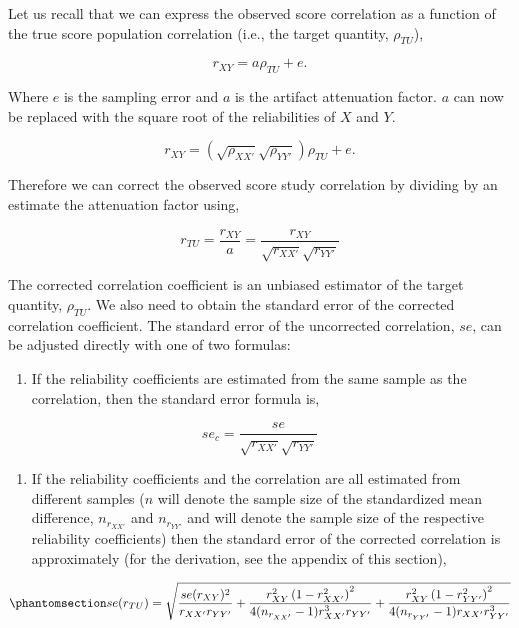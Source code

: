 \documentclass[
  letterpaper,
  DIV=11,
  numbers=noendperiod]{scrreprt}
\providecommand{\tightlist}{%
  \setlength{\itemsep}{0pt}\setlength{\parskip}{0pt}}\usepackage{longtable,booktabs,array}
\begin{document}
Let us recall that we can express the observed score correlation as a
function of the true score population correlation (i.e., the target
quantity, \(\rho_{TU}\)),

\[
r_{XY} = a\rho_{TU} + e.
\]

Where \(e\) is the sampling error and \(a\) is the artifact attenuation
factor. \(a\) can now be replaced with the square root of the
reliabilities of \(X\) and \(Y\).

\[
r_{XY} = \left(\sqrt{\rho_{XX'}}\sqrt{\rho_{YY'}}\right) \rho_{TU} + e.
\]

Therefore we can correct the observed score study correlation by
dividing by an estimate the attenuation factor using,

\[
r_{TU} = \frac{r_{XY}}{\hat{a}} = \frac{r_{XY}}{\sqrt{r_{XX'}}\sqrt{r_{YY'}}}
\]

The corrected correlation coefficient is an unbiased estimator of the
target quantity, \(\rho_{TU}\). We also need to obtain the standard
error of the corrected correlation coefficient. The standard error of
the uncorrected correlation, \(se\), can be adjusted directly with one
of two formulas:

\begin{enumerate}
\def\labelenumi{\arabic{enumi}.}
\tightlist
\item
  If the reliability coefficients are estimated from the same sample as
  the correlation, then the standard error formula is,
\end{enumerate}

\[
se_c =  \frac{se}{\sqrt{r_{XX'}}\sqrt{r_{YY'}}}
\]

\begin{enumerate}
\def\labelenumi{\arabic{enumi}.}
\setcounter{enumi}{1}
\tightlist
\item
  If the reliability coefficients and the correlation are all estimated
  from different samples (\(n\) will denote the sample size of the
  standardized mean difference, \(n_{r_{XX'}}\) and \(n_{r_{YY'}}\) and
  will denote the sample size of the respective reliability
  coefficients) then the standard error of the corrected correlation is
  approximately (for the derivation, see the appendix of this section),
\end{enumerate}

\begin{equation}\phantomsection\label{eq-se-me-r-tsa}{
se(r_{TU}) = \sqrt{\frac{se(r_{XY})^2}{r_{XX'}r_{YY'}} + 
\frac{r^2_{XY}\left(1-r^2_{XX'}\right)^2}{4(n_{r_{XX'}}-1)r_{XX'}^3r_{YY'}} + 
\frac{r^2_{XY}\left(1-r^2_{YY'}\right)^2}{4(n_{r_{YY'}}-1)r_{XX'}r_{YY'}^3}}
}\end{equation}
\end{document}

